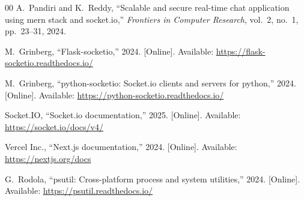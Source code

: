 \documentclass[conference]{IEEEtran}
\begin{document}
\begin{thebibliography}{00}
A.~Pandiri and K.~Reddy, ``Scalable and secure real-time chat application using mern stack and socket.io,'' \emph{Frontiers in Computer Research}, vol.~2, no.~1, pp.~23--31, 2024.

M.~Grinberg, ``Flask-socketio,'' 2024. [Online]. Available: \url{https://flask-socketio.readthedocs.io/}

M.~Grinberg, ``python-socketio: Socket.io clients and servers for python,'' 2024. [Online]. Available: \url{https://python-socketio.readthedocs.io/}

Socket.IO, ``Socket.io documentation,'' 2025. [Online]. Available: \url{https://socket.io/docs/v4/}

Vercel Inc., ``Next.js documentation,'' 2024. [Online]. Available: \url{https://nextjs.org/docs}

G.~Rodola, ``psutil: Cross-platform process and system utilities,'' 2024. [Online]. Available: \url{https://psutil.readthedocs.io/}

\end{thebibliography}
\end{document}
